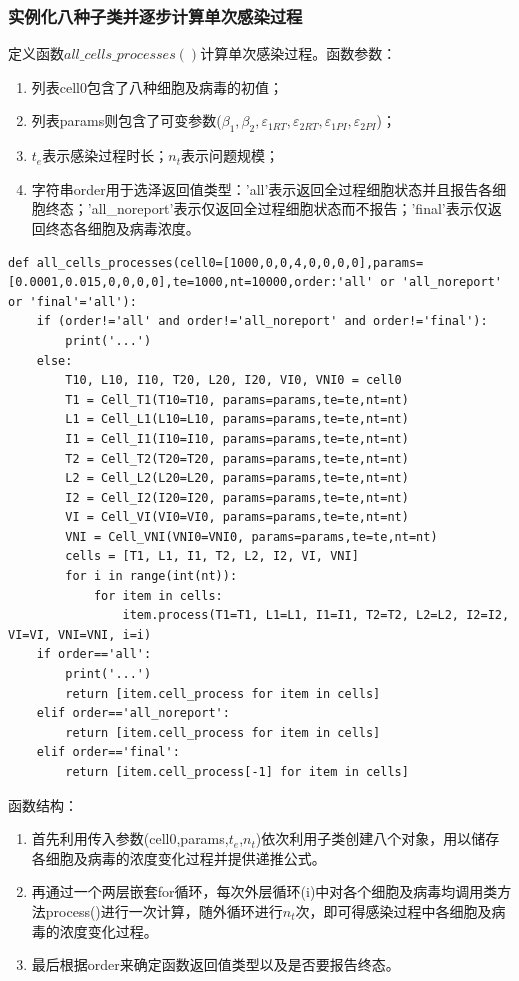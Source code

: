 \documentclass{ctexart}
\begin{document}
\subsubsection{实例化八种子类并逐步计算单次感染过程}
定义函数$all\_cells\_processes()$计算单次感染过程。函数参数：
\begin{enumerate}
    \item 列表cell0包含了八种细胞及病毒的初值；
    \item 列表params则包含了可变参数($\beta_{1},\beta_{2},\varepsilon _{1RT},\varepsilon _{2RT},\varepsilon _{1PI},\varepsilon _{2PI}$)；
    \item $t_{e}$表示感染过程时长；$n_{t}$表示问题规模；
    \item 字符串order用于选泽返回值类型：'all'表示返回全过程细胞状态并且报告各细胞终态；'all\_noreport'表示仅返回全过程细胞状态而不报告；'final'表示仅返回终态各细胞及病毒浓度。
\end{enumerate}
\begin{lstlisting}[label={lst.3}, caption={实例化子类并逐步进行数值模拟}]
    def all_cells_processes(cell0=[1000,0,0,4,0,0,0,0],params=[0.0001,0.015,0,0,0,0],te=1000,nt=10000,order:'all' or 'all_noreport' or 'final'='all'):
    if (order!='all' and order!='all_noreport' and order!='final'):
        print('...')
    else:
        T10, L10, I10, T20, L20, I20, VI0, VNI0 = cell0
        T1 = Cell_T1(T10=T10, params=params,te=te,nt=nt)
        L1 = Cell_L1(L10=L10, params=params,te=te,nt=nt)
        I1 = Cell_I1(I10=I10, params=params,te=te,nt=nt)
        T2 = Cell_T2(T20=T20, params=params,te=te,nt=nt)
        L2 = Cell_L2(L20=L20, params=params,te=te,nt=nt)
        I2 = Cell_I2(I20=I20, params=params,te=te,nt=nt)
        VI = Cell_VI(VI0=VI0, params=params,te=te,nt=nt)
        VNI = Cell_VNI(VNI0=VNI0, params=params,te=te,nt=nt)
        cells = [T1, L1, I1, T2, L2, I2, VI, VNI]
        for i in range(int(nt)):
            for item in cells:
                item.process(T1=T1, L1=L1, I1=I1, T2=T2, L2=L2, I2=I2, VI=VI, VNI=VNI, i=i)
    if order=='all':
        print('...')
        return [item.cell_process for item in cells]
    elif order=='all_noreport':
        return [item.cell_process for item in cells]
    elif order=='final':
        return [item.cell_process[-1] for item in cells]
\end{lstlisting}
函数结构：
\begin{enumerate}
    \item 首先利用传入参数(cell0,params,$t_{e}$,$n_{t}$)依次利用子类创建八个对象，用以储存各细胞及病毒的浓度变化过程并提供递推公式。
    \item 再通过一个两层嵌套for循环，每次外层循环(i)中对各个细胞及病毒均调用类方法process()进行一次计算，随外循环进行$n_{t}$次，即可得感染过程中各细胞及病毒的浓度变化过程。
    \item 最后根据order来确定函数返回值类型以及是否要报告终态。
\end{enumerate}
\end{document}
